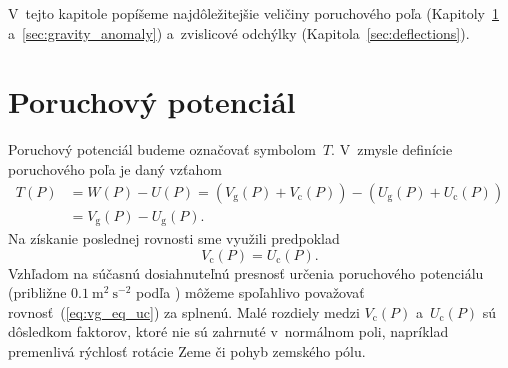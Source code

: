 \documentclass[a4paper,12pt]{book}
\newcommand{\gidx}{\mathrm g}
\newcommand{\cidx}{\mathrm c}
\begin{document}
V~tejto kapitole popíšeme najdôležitejšie veličiny poruchového poľa 
(Kapitoly~\ref{sec:disturbing_potential} a~\ref{sec:gravity_anomaly}) 
a~zvislicové odchýlky (Kapitola~\ref{sec:deflections}).






\section{Poruchový potenciál}
\label{sec:disturbing_potential}

Poruchový potenciál budeme označovať symbolom~$T$.  V~zmysle definície 
poruchového poľa je daný vzťahom
%
\begin{equation}
\label{eq:disturbing_potential}
\begin{split}
T(P) &= W(P) - U(P) = (V_\gidx(P) + V_\cidx(P)) - (U_\gidx(P) + U_\cidx(P))\\
%
&= V_\gidx(P) - U_\gidx(P){.}
\end{split}
\end{equation}
%
Na získanie poslednej rovnosti sme využili predpoklad
%
\begin{equation}
\label{eq:vg_eq_uc}
V_\cidx(P) = U_\cidx(P){.}
\end{equation}
%
Vzhľadom na súčasnú dosiahnuteľnú presnosť určenia poruchového potenciálu 
(približne $0.1\ \mathrm{m}^2 \ \mathrm{s}^{-2}$ podľa 
\cite{SansoGeoidDetermination}) môžeme spoľahlivo považovať 
rovnosť~(\ref{eq:vg_eq_uc}) za splnenú.  Malé rozdiely medzi $V_\cidx(P)$ 
a~$U_\cidx(P)$ sú dôsledkom faktorov, ktoré nie sú zahrnuté v~normálnom poli, 
napríklad premenlivá rýchlosť rotácie Zeme či pohyb zemského pólu.
\end{document}
